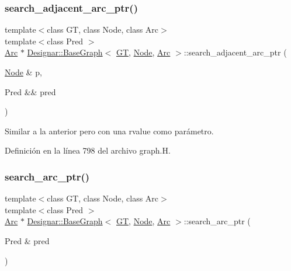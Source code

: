 \subsubsection{\texorpdfstring{search\+\_\+adjacent\+\_\+arc\+\_\+ptr()}{search\_adjacent\_arc\_ptr()}\hspace{0.1cm}{\footnotesize\ttfamily [2/2]}}
{\footnotesize\ttfamily template$<$class GT, class Node, class Arc$>$ \\
template$<$class Pred $>$ \\
\hyperlink{namespace_designar_a3f55fb5513d62ff47cbc8f72b8e95d6f}{Arc} $\ast$ \hyperlink{class_designar_1_1_base_graph}{Designar\+::\+Base\+Graph}$<$ \hyperlink{demo-buildgraph_8_c_a3001c40d2c31ca87ed96cd7d1334a55e}{GT}, \hyperlink{namespace_designar_a5af326c65aa2bd26b26c410f2030d09e}{Node}, \hyperlink{namespace_designar_a3f55fb5513d62ff47cbc8f72b8e95d6f}{Arc} $>$\+::search\+\_\+adjacent\+\_\+arc\+\_\+ptr (\begin{DoxyParamCaption}\item[{\hyperlink{namespace_designar_a5af326c65aa2bd26b26c410f2030d09e}{Node} \&}]{p,  }\item[{Pred \&\&}]{pred }\end{DoxyParamCaption})\hspace{0.3cm}{\ttfamily [inline]}}



Similar a la anterior pero con una rvalue como parámetro. 



Definición en la línea 798 del archivo graph.\+H.

\mbox{\label{class_designar_1_1_base_graph_a27d1effa356e6570ddca3c71559e7eb7}} 
\subsubsection{\texorpdfstring{search\+\_\+arc\+\_\+ptr()}{search\_arc\_ptr()}\hspace{0.1cm}{\footnotesize\ttfamily [1/2]}}
{\footnotesize\ttfamily template$<$class GT, class Node, class Arc$>$ \\
template$<$class Pred $>$ \\
\hyperlink{namespace_designar_a3f55fb5513d62ff47cbc8f72b8e95d6f}{Arc} $\ast$ \hyperlink{class_designar_1_1_base_graph}{Designar\+::\+Base\+Graph}$<$ \hyperlink{demo-buildgraph_8_c_a3001c40d2c31ca87ed96cd7d1334a55e}{GT}, \hyperlink{namespace_designar_a5af326c65aa2bd26b26c410f2030d09e}{Node}, \hyperlink{namespace_designar_a3f55fb5513d62ff47cbc8f72b8e95d6f}{Arc} $>$\+::search\+\_\+arc\+\_\+ptr (\begin{DoxyParamCaption}\item[{Pred \&}]{pred }\end{DoxyParamCaption})\hspace{0.3cm}{\ttfamily [inline]}}



